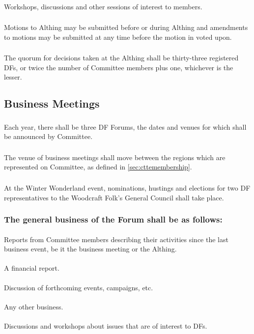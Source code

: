 \documentclass[a4paper, 12pt]{article}
\begin{document}
\paragraph{}
Workshops, discussions and other sessions of interest to members.
\subsubsection{}
Motions to Althing may be submitted before or during Althing and amendments to motions may be submitted at any time before the motion in voted upon.
\subsubsection{}
The quorum for decisions taken at the Althing shall be thirty-three registered DFs, or twice the number of Committee members plus one, whichever is the lesser.

\subsection{Business Meetings}
\subsubsection{}
Each year, there shall be three DF Forums, the dates and venues for which shall be announced by Committee. 
\subsubsection{}
The venue of business meetings shall move between the regions which are represented on Committee, as defined in \ref{sec:cttemembership}.
\subsubsection{}
At the Winter Wonderland event, nominations, hustings and elections for two DF representatives to the Woodcraft Folk’s General Council shall take place.
\subsubsection{The general business of the Forum shall be as follows:}
\paragraph{}
Reports from Committee members describing their activities since the last business event, be it the business meeting or the Althing.
\paragraph{}
A financial report.
\paragraph{}
Discussion of forthcoming events, campaigns, etc. 
\paragraph{}
Any other business.
\paragraph{}
Discussions and workshops about issues that are of interest to DFs. 
\end{document}
